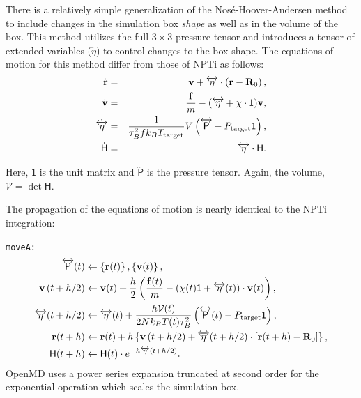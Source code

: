 \documentclass[]{book}
\begin{document}
There is a relatively simple generalization of the
Nos\'e-Hoover-Andersen method to include changes in the simulation box
{\it shape} as well as in the volume of the box.  This method utilizes
the full $3 \times 3$ pressure tensor and introduces a tensor of
extended variables ($\overleftrightarrow{\eta}$) to control changes to
the box shape.  The equations of motion for this method differ from
those of NPTi as follows:
\begin{eqnarray}
\dot{{\bf r}} & = & {\bf v} + \overleftrightarrow{\eta} \cdot \left( {\bf r} - {\bf R}_0 \right), \\
\dot{{\bf v}} & = & \frac{{\bf f}}{m} - (\overleftrightarrow{\eta} +
\chi \cdot \mathsf{1}) {\bf v}, \\
\dot{\overleftrightarrow{\eta}} & = & \frac{1}{\tau_{B}^2 f k_B
T_{\mathrm{target}}} V \left( \overleftrightarrow{\mathsf{P}} - P_{\mathrm{target}}\mathsf{1} \right) ,\\
\dot{\mathsf{H}} & = &  \overleftrightarrow{\eta} \cdot \mathsf{H} .
\label{eq:melchionna2}
\end{eqnarray}

Here, $\mathsf{1}$ is the unit matrix and $\overleftrightarrow{\mathsf{P}}$
is the pressure tensor.  Again, the volume, $\mathcal{V} = \det
\mathsf{H}$. 

The propagation of the equations of motion is nearly identical to the
NPTi integration:

{\tt moveA:}
\begin{align*}
\overleftrightarrow{\mathsf{P}}(t) &\leftarrow \left\{{\bf r}(t)\right\}, 
	\left\{{\bf v}(t)\right\} ,\\
%
{\bf v}\left(t + h / 2\right)  &\leftarrow {\bf v}(t) 
	+ \frac{h}{2} \left( \frac{{\bf f}(t)}{m} - 
	\left(\chi(t)\mathsf{1} + \overleftrightarrow{\eta}(t) \right) \cdot
	{\bf v}(t) \right), \\ 
%
\overleftrightarrow{\eta}(t + h / 2) &\leftarrow 
	\overleftrightarrow{\eta}(t) + \frac{h \mathcal{V}(t)}{2 N k_B
	T(t) \tau_B^2} \left( \overleftrightarrow{\mathsf{P}}(t) 
	- P_{\mathrm{target}}\mathsf{1} \right), \\ 
%
{\bf r}(t + h) &\leftarrow {\bf r}(t) + h \left\{ {\bf v}
	\left(t + h / 2 \right) + \overleftrightarrow{\eta}(t +
	h / 2) \cdot \left[ {\bf r}(t + h) 
	- {\bf R}_0 \right] \right\}, \\
%
\mathsf{H}(t + h) &\leftarrow \mathsf{H}(t) \cdot e^{-h
	\overleftrightarrow{\eta}(t + h / 2)} .
\end{align*}
{\sc OpenMD} uses a power series expansion truncated at second order
for the exponential operation which scales the simulation box.
\end{document}
